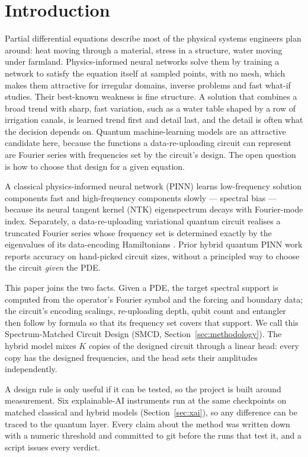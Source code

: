 \section{Introduction}
\label{sec:intro}

Partial differential equations describe most of the physical systems engineers plan
around: heat moving through a material, stress in a structure, water moving under
farmland. Physics-informed neural networks \citep{raissi2019pinn} solve them by training a
network to satisfy the equation itself at sampled points, with no mesh, which makes them
attractive for irregular domains, inverse problems and fast what-if studies. Their
best-known weakness is fine structure. A solution that combines a broad trend with sharp,
fast variation, such as a water table shaped by a row of irrigation canals, is learned
trend first and detail last, and the detail is often what the decision depends on.
Quantum machine-learning models are an attractive candidate here, because the functions a
data-re-uploading circuit can represent are Fourier series with frequencies set by the
circuit's design. The open question is how to choose that design for a given equation.

A classical physics-informed neural network (PINN) learns low-frequency solution
components fast and high-frequency components slowly --- spectral bias --- because its
neural tangent kernel (NTK) eigenspectrum decays with Fourier-mode index. Separately, a
data-re-uploading variational quantum circuit realises a truncated Fourier series whose
frequency set is determined exactly by the eigenvalues of its data-encoding Hamiltonians
\citep{schuld2021effect}. Prior hybrid quantum PINN work
\citep{hybrid_qpinn_mlst,hybrid_when_where_2606,qpinn_maxwell_2506,cq_hybrid_arch_2511}
reports accuracy on hand-picked circuit sizes, without a principled way to choose the
circuit \emph{given} the PDE.

This paper joins the two facts. Given a PDE, the target spectral support is computed
from the operator's Fourier symbol and the forcing and boundary data; the circuit's
encoding scalings, re-uploading depth, qubit count and entangler then follow by formula
so that its frequency set covers that support. We call this Spectrum-Matched Circuit
Design (SMCD, Section~\ref{sec:methodology}). The hybrid model mixes $K$ copies of the
designed circuit through a linear head: every copy has the designed frequencies, and the
head sets their amplitudes independently.

A design rule is only useful if it can be tested, so the project is built around
measurement. Six explainable-AI instruments run at the same checkpoints on matched
classical and hybrid models (Section~\ref{sec:xai}), so any difference can be traced to
the quantum layer. Every claim about the method was written down with a numeric
threshold and committed to git before the runs that test it, and a script issues every
verdict.


